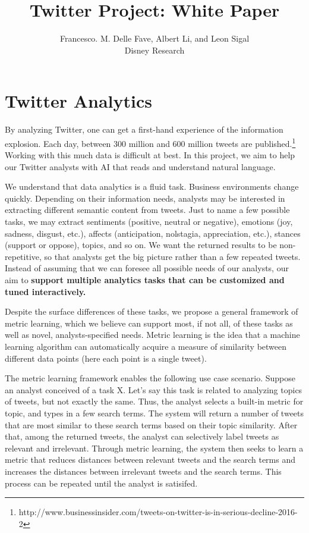 \documentclass[letterpaper]{article}
\begin{document}
%
\title{Twitter Project: White Paper}
\author{Francesco. M. Delle Fave, Albert Li, and Leon Sigal \\
Disney Research
}
\maketitle

\section{Twitter Analytics}

By analyzing Twitter, one can get a first-hand experience of the information explosion. Each day, between 300 million and 600 million tweets are published.\footnote{http://www.businessinsider.com/tweets-on-twitter-is-in-serious-decline-2016-2} Working with this much data is difficult at best. In this project, we aim to help our Twitter analysts with AI that reads and understand natural language. 

We understand that data analytics is a fluid task. Business environments change quickly. Depending on their information needs, analysts may be interested in extracting different semantic content from tweets. Just to name a few possible tasks, we may extract sentiments (positive, neutral or negative), emotions (joy, sadness, disgust, etc.), affects (anticipation, nolstagia, appreciation, etc.), stances (support or oppose), topics, and so on. We want the returned results to be non-repetitive, so that analysts get the big picture rather than a few repeated tweets. Instead of assuming that we can foresee all possible needs of our analysts, our aim to  {\bf support multiple analytics tasks that can be  customized and tuned interactively.} 

Despite the surface differences of these tasks, we propose a general framework of metric learning, which we believe can support most, if not all, of these tasks as well as novel, analysts-specified needs. Metric learning is the idea that a machine learning algorithm can automatically acquire a measure of similarity between different data points (here each point is a single tweet).

The metric learning framework enables the following use case scenario. Suppose an analyst conceived of a task X. Let's say this task is related to analyzing topics of tweets, but not exactly the same. Thus, the analyst selects a built-in metric for topic, and types in a few search terms. The system will return a number of tweets that are most similar to these search terms based on their topic similarity. After that, among the returned tweets, the analyst can selectively label tweets as relevant and irrelevant. Through metric learning, the system then seeks to learn a metric that reduces distances between relevant tweets and the search terms and increases the distances between irrelevant tweets and the search terms. This process can be repeated until the analyst is satisifed. 
\end{document}
